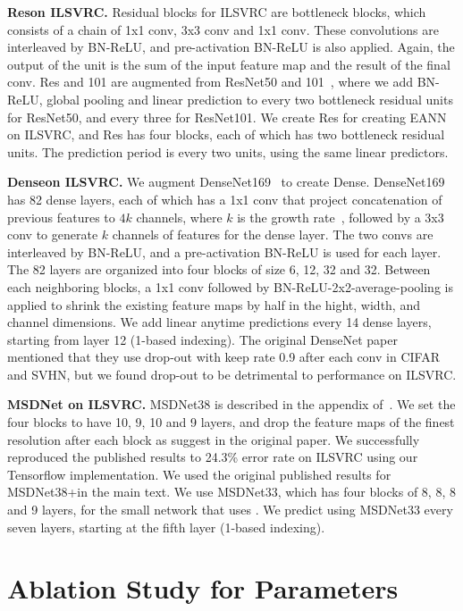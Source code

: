 \textbf{Res\anns on ILSVRC.} Residual blocks for ILSVRC are bottleneck blocks, which consists of a chain of 1x1 conv, 3x3 conv and 1x1 conv. These convolutions are interleaved by BN-ReLU, and pre-activation BN-ReLU is also applied. Again, the output of the unit is the sum of the input feature map and the result of the final conv. 
Res and 101 are augmented from ResNet50 and 101~\cite{resnet}, where we add BN-ReLU, global pooling and linear prediction to every two bottleneck residual units for ResNet50, and every three for ResNet101. 
We create Res for creating EANN on ILSVRC, and Res has four blocks, each of which has two bottleneck residual units. The prediction period is every two units, using the same linear predictors. 


\textbf{Dense\anns on ILSVRC.} We augment DenseNet169~\cite{densenet} to create Dense. 
DenseNet169 has 82 dense layers, each of which has a 1x1 conv that project concatenation of previous features to $4k$ channels, where $k$ is the growth rate~\cite{densenet}, followed by a 3x3 conv to generate $k$ channels of features for the dense layer. The two convs are interleaved by BN-ReLU, and a pre-activation BN-ReLU is used for each layer. The 82 layers are organized into four blocks of size 6, 12, 32 and 32. Between each neighboring blocks, a 1x1 conv followed by BN-ReLU-2x2-average-pooling is applied to shrink the existing feature maps by half in the hight, width, and channel dimensions. We add linear anytime predictions every 14 dense layers, starting from layer 12 (1-based indexing). The original DenseNet paper~\cite{densenet} mentioned that they use drop-out with keep rate 0.9 after each conv in CIFAR and SVHN, but we found drop-out to be detrimental to performance on ILSVRC.


\textbf{MSDNet on ILSVRC.} MSDNet38 is described in the appendix of~\cite{msdense}. We set the four blocks to have 10, 9, 10 and 9 layers, and drop the feature maps of the finest resolution after each block as suggest in the original paper. 
We successfully reproduced the published results to 24.3\% error rate on ILSVRC using our Tensorflow implementation. We used the original published results for MSDNet38+\const in the main text. We use MSDNet33, which has four blocks of 8, 8, 8 and 9 layers, for the small network that uses \adaloss. We predict using MSDNet33 every seven layers, starting at the fifth layer (1-based indexing). 



\section{Ablation Study for \adaloss Parameters}

